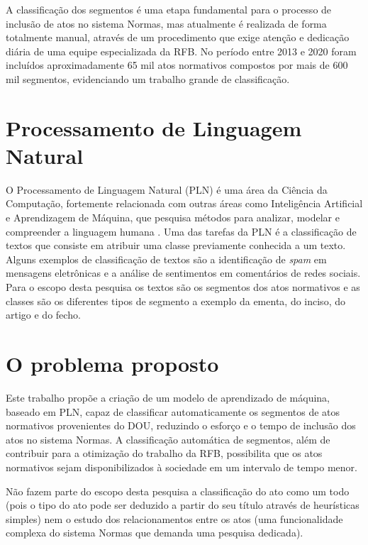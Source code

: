 A classificação dos segmentos é uma etapa fundamental para o processo de inclusão de atos no sistema Normas, mas atualmente é realizada de forma totalmente manual, através de um procedimento que exige atenção e dedicação diária de uma equipe especializada da RFB. No período entre 2013 e 2020 foram incluídos aproximadamente 65 mil atos normativos compostos por mais de 600 mil segmentos, evidenciando um trabalho grande de classificação.

\section{Processamento de Linguagem Natural}

O Processamento de Linguagem Natural (PLN) é uma área da Ciência da Computação, fortemente relacionada com outras áreas como Inteligência Artificial e Aprendizagem de Máquina, que pesquisa métodos para analizar, modelar e compreender a linguagem humana \cite{PracticalNLP2020}. Uma das tarefas da PLN é a classificação de textos que consiste em atribuir uma classe previamente conhecida a um texto. Alguns exemplos de classificação de textos são a identificação de \textit{spam} em mensagens eletrônicas e a análise de sentimentos em comentários de redes sociais. Para o escopo desta pesquisa os textos são os segmentos dos atos normativos e as classes são os diferentes tipos de segmento a exemplo da ementa, do inciso, do artigo e do fecho. 

\section{O problema proposto}

Este trabalho propõe a criação de um modelo de aprendizado de máquina, baseado em PLN, capaz de classificar automaticamente os segmentos de atos normativos provenientes do DOU, reduzindo o esforço e o tempo de inclusão dos atos no sistema Normas. A classificação automática de segmentos, além de contribuir para a otimização do trabalho da RFB, possibilita que os atos normativos sejam disponibilizados à sociedade em um intervalo de tempo menor.

Não fazem parte do escopo desta pesquisa a classificação do ato como um todo (pois o tipo do ato pode ser deduzido a partir do seu título através de heurísticas simples) nem o estudo dos relacionamentos entre os atos (uma funcionalidade complexa do sistema Normas que demanda uma pesquisa dedicada).

